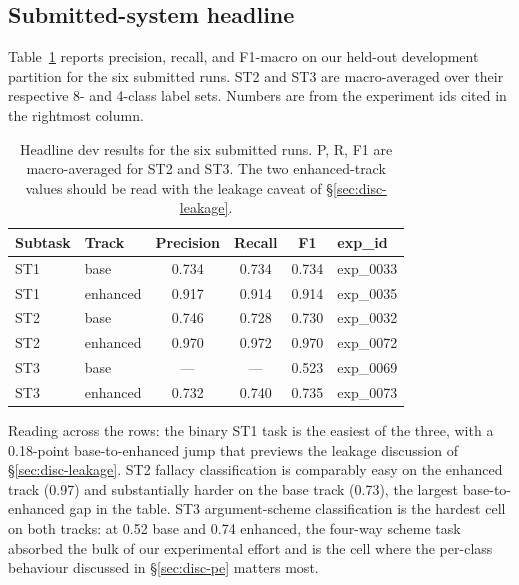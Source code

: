\subsection{Submitted-system headline}
\label{sec:headline}

Table~\ref{tab:headline} reports precision, recall, and F1-macro on our held-out development partition for the six submitted runs. ST2 and ST3 are macro-averaged over their respective 8- and 4-class label sets. Numbers are from the experiment ids cited in the rightmost column.

\begin{table}[h]
\centering
\small
\caption{Headline dev results for the six submitted runs. P, R, F1 are macro-averaged
for ST2 and ST3. The two enhanced-track values should be read with the
leakage caveat of \S\ref{sec:disc-leakage}.}
\label{tab:headline}
\begin{tabular}{llcccl}
\toprule
Subtask & Track & Precision & Recall & F1 & exp\_id \\
\midrule
ST1 & base     & 0.734 & 0.734 & 0.734 & exp\_0033 \\ %
ST1 & enhanced & 0.917 & 0.914 & 0.914 & exp\_0035 \\ %
ST2 & base     & 0.746 & 0.728 & 0.730 & exp\_0032 \\ %
ST2 & enhanced & 0.970 & 0.972 & 0.970 & exp\_0072 \\ %
ST3 & base     & ---   & ---   & 0.523 & exp\_0069 \\ %
ST3 & enhanced & 0.732 & 0.740 & 0.735 & exp\_0073 \\ %
\bottomrule
\end{tabular}
\end{table}

Reading across the rows: the binary ST1 task is the easiest of the three, with a 0.18-point base-to-enhanced jump that previews the leakage discussion of \S\ref{sec:disc-leakage}. ST2 fallacy classification is comparably easy on the enhanced track (0.97) and substantially harder on the base track (0.73), the largest base-to-enhanced gap in the table. ST3 argument-scheme classification is the hardest cell on both tracks: at 0.52 base and 0.74 enhanced, the four-way scheme task absorbed the bulk of our experimental effort and is the cell where the per-class behaviour discussed in \S\ref{sec:disc-pe} matters most.

